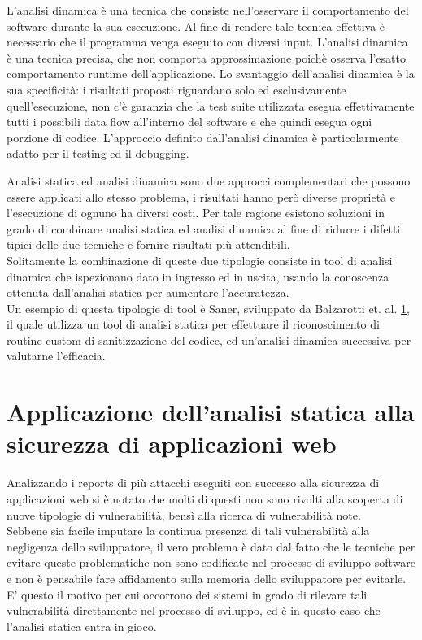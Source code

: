 L'analisi dinamica è una tecnica che consiste nell'osservare il comportamento del software durante la sua esecuzione. Al fine di rendere tale tecnica effettiva è necessario che il programma venga eseguito con diversi input. L'analisi dinamica è una tecnica precisa, che non comporta approssimazione poichè osserva l'esatto comportamento runtime dell'applicazione.
Lo svantaggio dell'analisi dinamica è la sua specificità: i risultati proposti riguardano solo ed esclusivamente quell'esecuzione, non c'è garanzia che la test suite utilizzata esegua effettivamente tutti i possibili data flow all'interno del software e che quindi esegua ogni porzione di codice. L'approccio definito dall'analisi dinamica è particolarmente adatto per il testing ed il debugging.

Analisi statica ed analisi dinamica sono due approcci complementari che possono essere applicati allo stesso problema, i risultati hanno però diverse proprietà e l'esecuzione di ognuno ha diversi costi. Per tale ragione esistono soluzioni in grado di combinare analisi statica ed analisi dinamica al fine di ridurre i difetti tipici delle due tecniche e fornire risultati più attendibili.\\
Solitamente la combinazione di queste due tipologie consiste in tool di analisi dinamica che ispezionano dato in ingresso ed in uscita, usando la conoscenza ottenuta dall'analisi statica per aumentare l'accuratezza.\\
Un esempio di questa tipologie di tool è Saner, sviluppato da Balzarotti et. al. \ref{}, il quale utilizza un tool di analisi statica per effettuare il riconoscimento di routine custom  di sanitizzazione del codice, ed un'analisi dinamica successiva per valutarne l'efficacia. 

\chapter{Applicazione dell'analisi statica alla sicurezza di applicazioni web}
Analizzando i reports di più attacchi eseguiti con successo alla sicurezza di applicazioni web si è notato che molti di questi non sono rivolti alla scoperta di nuove tipologie di vulnerabilità, bensì alla ricerca di vulnerabilità note.\\ Sebbene sia facile imputare la continua presenza di tali vulnerabilità alla negligenza dello sviluppatore, il vero problema è dato dal fatto che le tecniche per evitare queste problematiche non sono codificate nel processo di sviluppo software e non è pensabile fare affidamento sulla memoria dello sviluppatore per evitarle. E' questo il motivo per cui occorrono dei sistemi in grado di rilevare tali vulnerabilità direttamente nel processo di sviluppo, ed è in questo caso che l'analisi statica entra in gioco.


